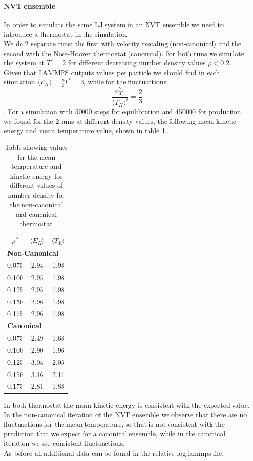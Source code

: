\paragraph{NVT ensemble} In order to simulate the same LJ system in an NVT ensemble we need to introduce a thermostat in the simulation. \\
We do 2 separate runs: the first with velocity rescaling (non-canonical) and the second with the Nose-Hoover thermostat (canonical). For both runs we simulate the system at $T^* = 2$ for different decreasing number density values $\rho < 0.2$. \\
Given that LAMMPS outputs values per particle we should find in each simulation $\langle E_K \rangle = \frac{3}{2} T^* = 3$, while for the fluctuactions $$ \frac{\sigma^2_{T_K}}{\langle T_K \rangle^2} = \frac{2}{3}$$.
For a simulation with 50000 steps for equilibration and 450000 for production we found for the 2 runs at different density values, the following mean kinetic energy and mean temperature value, shown in table \ref{ex10:table}.


\begin{table}[ht]
    \centering
    \begin{tabular}{c|cc}
        \toprule
        \( \rho^* \) & \( \langle E_K \rangle \) & \( \langle T_K \rangle \) \\
        \midrule
        \multicolumn{3}{l}{\textbf{Non-Canonical}} \\
        0.075 & 2.94 & 1.98 \\
        0.100 & 2.95 & 1.98 \\
        0.125 & 2.95 & 1.98 \\
        0.150 & 2.96 & 1.98 \\
        0.175 & 2.96 & 1.98 \\
        \midrule
        \multicolumn{3}{l}{\textbf{Canonical}} \\
        0.075 & 2.49 & 1.68 \\
        0.100 & 2.90 & 1.96\\
        0.125 & 3.04 & 2.05\\
        0.150 & 3.16 & 2.11 \\
        0.175 & 2.81 & 1.88 \\
        \bottomrule
    \end{tabular}
    \caption{Table showing values for the mean temperature and kinetic energy for different values of number density for the non-canonical and canonical thermostat}
    \label{ex10:table}
\end{table}

In both thermostat the mean kinetic energy is consistent with the expected value. \\
In the non-canonical iteration of the NVT ensemble we observe that there are no fluctuactions for the mean temperature, so that is not consistent with the prediction that we expect for a canonical ensemble, while in the canonical iteration we see consistent fluctuactions. \\
As before all additional data can be found in the relative log.lammps file.